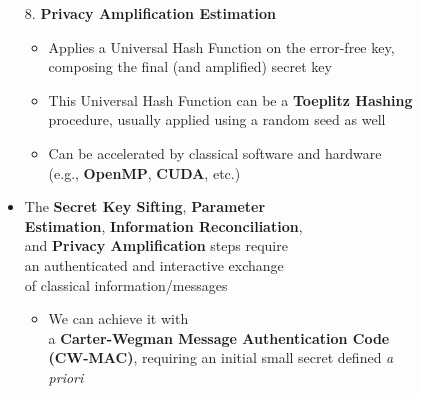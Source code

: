 \documentclass{beamer}
\begin{document}
\begin{frame}
\begin{figure}
\begin{minipage}{0.4\textwidth}
                    \caption{\color{blue}{Figure 2: }\color{black}{Flowchart of a QKD protocol}}
                    \label{fig:qkd-protocol-flowchart-3}
                \end{minipage}%
                \hspace{0.05\textwidth}%
                \begin{minipage}{0.55\textwidth}
                    \begin{enumerate}\footnotesize
                        \item[8.] \textbf{Privacy Amplification Estimation}
                        \begin{itemize}\scriptsize
                            \item Applies a Universal Hash Function on the error-free key, composing the final (and amplified) secret key
                            \item This Universal Hash Function can be a \textbf{Toeplitz Hashing} procedure, usually applied using a random seed as well
                            \item Can be accelerated by classical software and hardware\\(e.g., \textbf{OpenMP}, \textbf{CUDA}, etc.)
                        \end{itemize}
                    \end{enumerate}

                    \begin{itemize}\scriptsize
                        \item The \textbf{Secret Key Sifting}, \textbf{Parameter\\ Estimation}, \textbf{Information Reconciliation},\\ and \textbf{Privacy Amplification} steps require\\ an authenticated and interactive exchange\\ of classical information/messages\\
                        \begin{itemize}\scriptsize
                            \item We can achieve it with\\ a \textbf{Carter-Wegman Message Authentication Code (CW-MAC)}, requiring an initial small secret defined \textit{a priori}
                        \end{itemize}
                    \end{itemize}
                \end{minipage}
            \end{figure}
   
		\end{frame}
  
\end{document}
